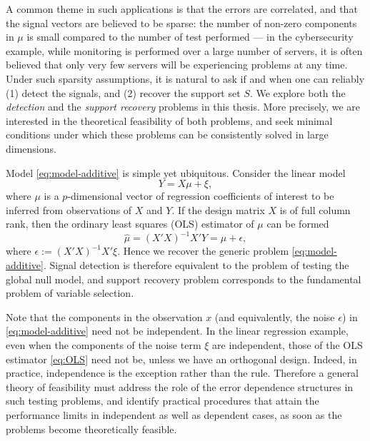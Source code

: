 A common theme in such applications is that the errors are correlated, and that the signal vectors are believed to be sparse: the number of non-zero components in $\mu$ is small compared to the number of test performed --- in the cybersecurity example, while monitoring is performed over a large number of servers, it is often believed that only very few servers will be experiencing problems at any time.
Under such sparsity assumptions, it is natural to ask if and when one can reliably {(1)} detect the signals, and {(2)} recover the support set $S$.
We explore both the \emph{detection} and the \emph{support recovery} problems in this thesis. 
More precisely, we are interested in the theoretical feasibility of both problems, and seek minimal conditions under which these problems can be consistently solved in large dimensions.


\medskip

Model \eqref{eq:model-additive} is simple yet ubiquitous.
Consider the linear model
\begin{equation*}
 Y = X\mu + \xi,
\end{equation*}
where $\mu$ is a $p$-dimensional vector of regression coefficients of interest to be inferred from observations of $X$ and $Y$.
If the design matrix $X$ is of full column rank, then the ordinary least squares (OLS) estimator of $\mu$ can be formed 
\begin{equation} \label{eq:OLS}
    \widehat{\mu} = \left(X'X\right)^{-1}X'Y = \mu + \epsilon,
\end{equation}
where $\epsilon := (X'X)^{-1}X'\xi$.
Hence we recover the generic problem \eqref{eq:model-additive}. 
Signal detection is therefore equivalent to the problem of testing the global null model, and support recovery problem corresponds to the fundamental problem of variable selection.

Note that the components in the observation $x$ (and equivalently, the noise $\epsilon$) in \eqref{eq:model-additive} need not be independent. 
In the linear regression example, even when the components of the noise term $\xi$ are independent, those of the OLS estimator \eqref{eq:OLS} need not be, unless we have an orthogonal design.
Indeed, in practice, independence is the exception rather than the rule.
Therefore a general theory of feasibility must address the role of the error dependence structures in such testing problems, and identify practical procedures that attain the performance limits in independent as well as dependent cases, as soon as the problems become theoretically feasible.


